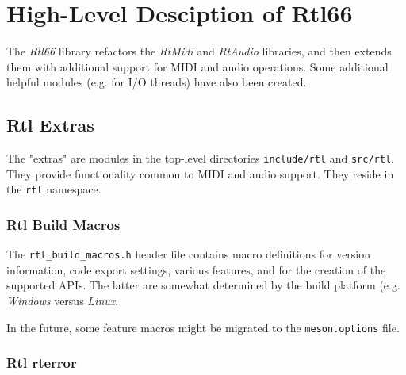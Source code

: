 %
%
%

\section{High-Level Desciption of Rtl66}
\label{sec:rtl_high_level}

   The \textsl{Rtl66} library refactors the \textsl{RtMidi} and
   \textsl{RtAudio} libraries, and then extends them with additional
   support for MIDI and audio operations.
   Some additional helpful modules (e.g. for I/O threads) have also
   been created.

\subsection{Rtl Extras}
\label{subsec:rtl_extras}

   The "extras" are modules in the top-level directories
   \texttt{include/rtl} and \texttt{src/rtl}.
   They provide functionality common to MIDI and audio support.
   They reside in the \texttt{rtl} namespace.

\subsubsection{Rtl Build Macros}
\label{subsubsec:rtl_build_macros}

   The \texttt{rtl\_build\_macros.h} header file contains macro
   definitions for version information, code export settings,
   various features, and for the creation of the supported APIs.
   The latter are somewhat determined by the build platform (e.g.
   \textsl{Windows} versus \textsl{Linux}.

   In the future, some feature macros might be migrated to the
   \texttt{meson.options} file.

\subsubsection{Rtl rterror}
\label{subsubsec:rtl_rterror}

